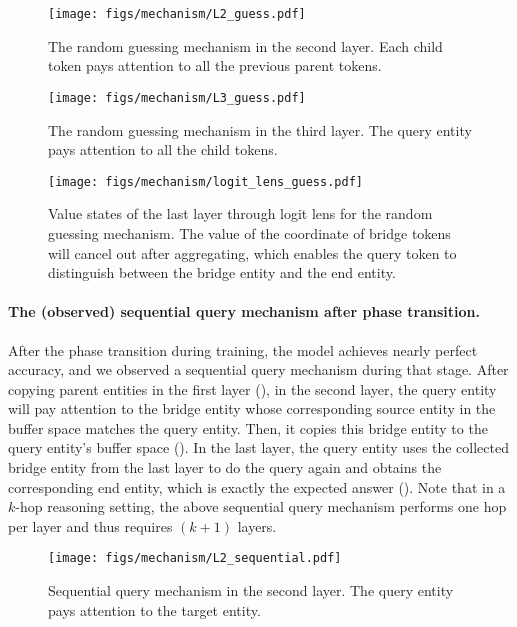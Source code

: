 \begin{figure}[h]
    \centering
    \texttt{[image: figs/mechanism/L2\_guess.pdf]}
    \caption{The random guessing mechanism in the second layer. Each child token pays attention to all the previous parent tokens.}
    \label{fig:mech:L2_guess}
\end{figure}

\begin{figure}[h]
    \centering
    \texttt{[image: figs/mechanism/L3\_guess.pdf]}
    \caption{The random guessing mechanism in the third layer. The query entity pays attention to all the child tokens.}
    \label{fig:mech:L3_guess}
\end{figure}

\begin{figure}[h]
    \centering
    \texttt{[image: figs/mechanism/logit\_lens\_guess.pdf]}
    \caption{Value states of the last layer through logit lens for the random guessing mechanism. The value of the coordinate of bridge tokens will cancel out after aggregating, which enables the query token to distinguish between the bridge entity and the end entity.}
    \label{fig:mech:logit_lens_guess}
\end{figure}

\paragraph{The (observed) sequential query mechanism after phase transition.} After the phase transition during training, the model achieves nearly perfect accuracy, and we observed a sequential query mechanism during that stage. After copying parent entities in the first layer (), in the second layer, the query entity will pay attention to the bridge entity whose corresponding source entity in the buffer space matches the query entity. Then, it copies this bridge entity to the query entity's buffer space (). In the last layer, the query entity uses the collected bridge entity from the last layer to do the query again and obtains the corresponding end entity, which is exactly the expected answer (). Note that in a $k$-hop reasoning setting, the above sequential query mechanism performs one hop per layer and thus requires $(k+1)$ layers.

\begin{figure}[h]
    \centering
    \texttt{[image: figs/mechanism/L2\_sequential.pdf]}
    \caption{Sequential query mechanism in the second layer. The query entity pays attention to the target \brga  entity.}
    \label{fig:mech:L2_sequential}
\end{figure}


